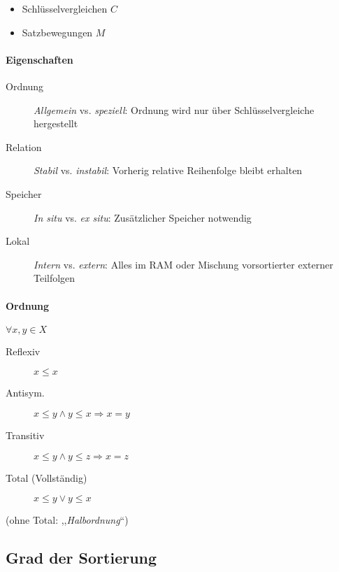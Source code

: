 \begin{itemize}
  \item Schlüsselvergleichen $C$
  \item Satzbewegungen $M$
\end{itemize}

\paragraph{Eigenschaften}

\begin{mzImportant}
  \begin{description}
    \item [Ordnung] \emph{Allgemein} vs. \emph{speziell}: Ordnung wird nur über Schlüsselvergleiche hergestellt
    \item [Relation] \emph{Stabil} vs. \emph{instabil}: Vorherig relative Reihenfolge bleibt erhalten
    \item [Speicher] \emph{In situ} vs. \emph{ex situ}: Zusätzlicher Speicher notwendig
    \item [Lokal] \emph{Intern} vs. \emph{extern}: Alles im RAM oder Mischung vorsortierter externer Teilfolgen
  \end{description}
\end{mzImportant}

\paragraph{Ordnung} $\forall x, y \in X$

\begin{description}
  \item[Reflexiv] $x \leq x$
  \item[Antisym.] $x \leq y \land y \leq x \Rightarrow x = y$
  \item[Transitiv] $x \leq y \land y \leq z \Rightarrow x = z$
  \item[Total (Vollständig)] $x \leq y \lor y \leq x$
\end{description}

(ohne Total: ,,\emph{Halbordnung}``)

\subsection{Grad der Sortierung}

